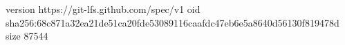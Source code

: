 version https://git-lfs.github.com/spec/v1
oid sha256:68c871a32ea21de51ca20fde53089116caafdc47eb6e5a8640d56130f819478d
size 87544
